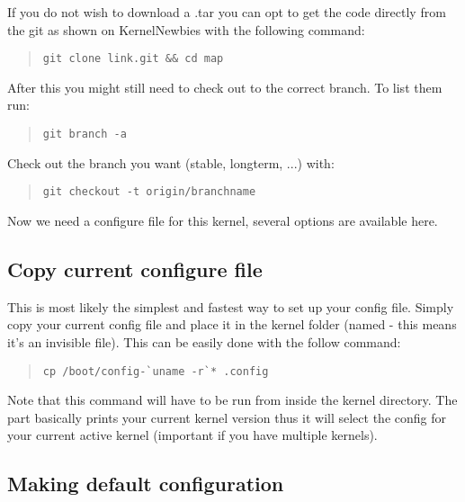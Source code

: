 \npar 

If you do not wish to download a .tar you can opt to get the code directly from the git as shown on KernelNewbies with the following command:

\begin{quote} \begin{verbatim}git clone link.git && cd map  \end{verbatim} \end{quote}

After this you might still need to check out to the correct branch. To list them run:

\begin{quote} \begin{verbatim}git branch -a \end{verbatim} \end{quote}

Check out the branch you want (stable, longterm, ...) with:

\begin{quote} \begin{verbatim}git checkout -t origin/branchname \end{verbatim} \end{quote}

Now we need a configure file for this kernel, several options are available here.

\subsection*{Copy current configure file}

This is most likely the simplest and fastest way to set up your config file. Simply copy your current config file and place it in the kernel folder (named  - this means it's an invisible file). This can be easily done with the follow command:

\begin{quote} \begin{verbatim}cp /boot/config-`uname -r`* .config \end{verbatim} \end{quote}

Note that this command will have to be run from inside the kernel directory. The part  basically prints your current kernel version thus it will select the config for your current active kernel (important if you have multiple kernels).

\subsection*{Making default configuration}

